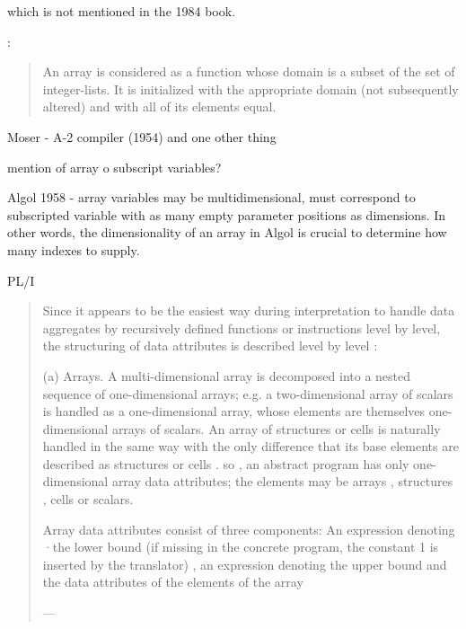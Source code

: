 which is not mentioned in the 1984 book.







\cite{Landin1965}:
\begin{quote}
An array is considered as a function whose domain is a subset of the set of integer-lists.
It is initialized with the appropriate domain (not subsequently altered) and with all of its elements equal.
\end{quote}


Moser - A-2 compiler (1954) and one other thing

mention of array o subscript variables?



Algol 1958 - array variables may be multidimensional, must correspond to subscripted variable with as many empty parameter positions as dimensions.
In other words, the dimensionality of an array in Algol is crucial to determine how many indexes to supply.

PL/I
\begin{quote}
Since it appears to be the
easiest way during interpretation to handle data aggregates by recursively defined
functions or instructions level by level, the structuring of data attributes is
described level by level :

(a)
Arrays. A multi-dimensional array is decomposed into a nested sequence of
one-dimensional arrays; e.g. a two-dimensional array of scalars is handled
as a one-dimensional array, whose elements are themselves one-dimensional
arrays of scalars. An array of structures or cells is naturally handled in
the same way with the only difference that its base elements are described
as structures or cells . so , an abstract program has only one-dimensional
array data attributes; the elements may be arrays , structures , cells or
scalars.

Array data attributes consist of three components: An expression denoting
·the lower bound (if missing in the concrete program, the constant 1 is inserted
by the translator) , an expression denoting the upper bound and the
data attributes of the elements of the array

--- \cite[\S 2.3.1, pp. 2-8--9]{Lucas1968}
\end{quote}

